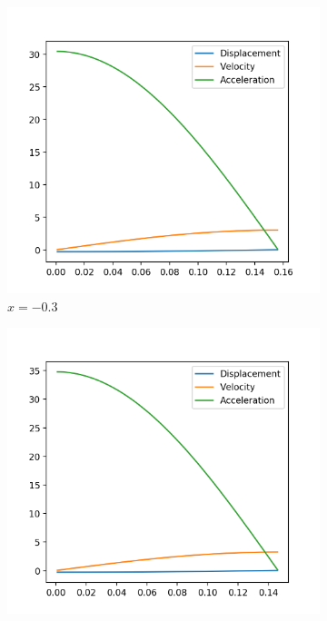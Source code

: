 \documentclass[12pt, letterpaper]{article}
\begin{document}
\begin{figure}[h]
  \caption{Varying Spring Constant}
  \label{fig:varyingConstant}
  \centering
  \begin{subfigure}[b]{.3\linewidth}
    \includegraphics[width=\linewidth]{Hooke/hooke7000-0_3.png}
    \caption{$x=-0.3$}
  \end{subfigure}
  \begin{subfigure}[b]{.3\linewidth}
    \includegraphics[width=\linewidth]{Hooke/hooke8000-0_3.png}

\end{subfigure}
\end{figure}
\end{document}
